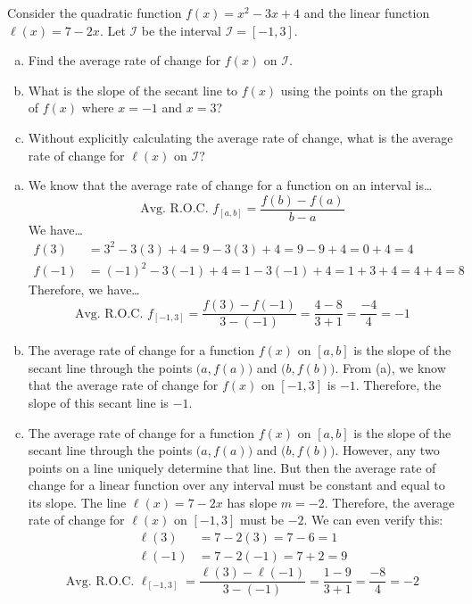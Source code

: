 \documentclass[12pt,letterpaper]{exam}
\begin{document}
\begin{questions}
	

\newpage
\question[10] Consider the quadratic function $f(x)= x^2 - 3x + 4$ and the linear function $\ell(x)= 7 - 2x$. Let $\mathcal{I}$ be the interval $\mathcal{I}= [-1, 3]$.
	\begin{enumerate}[(a)]
	\item Find the average rate of change for $f(x)$ on $\mathcal{I}$.
	\item What is the slope of the secant line to $f(x)$ using the points on the graph of $f(x)$ where $x= -1$ and $x= 3$?
	\item Without explicitly calculating the average rate of change, what is the average rate of change for $\ell(x)$ on $\mathcal{I}$?
	\end{enumerate} \pspace

\sol 
\begin{enumerate}[(a)]
\item We know that the average rate of change for a function on an interval is\dots
	\[
	\text{Avg. R.O.C. } f_{[a,b]}= \dfrac{f(b) - f(a)}{b - a}
	\]
We have\dots
	\[
	\begin{aligned}
	f(3)&= 3^2 - 3(3) + 4= 9 - 3(3) + 4= 9 - 9 + 4= 0 + 4= 4 \\
	f(-1)&= (-1)^2 - 3(-1) + 4= 1 - 3(-1) + 4= 1 + 3 + 4= 4 + 4= 8 
	\end{aligned}
	\]
Therefore, we have\dots
	\[
	\text{Avg. R.O.C. } f_{[-1,3]}= \dfrac{f(3) - f(-1)}{3 - (-1)}= \dfrac{4 - 8}{3 + 1}= \dfrac{-4}{4}= -1
	\] \pspace

\item The average rate of change for a function $f(x)$ on $[a, b]$ is the slope of the secant line through the points $\big(a, f(a) \big)$ and $\big(b, f(b) \big)$. From (a), we know that the average rate of change for $f(x)$ on $[-1, 3]$ is $-1$. Therefore, the slope of this secant line is $-1$. \pspace

\item The average rate of change for a function $f(x)$ on $[a, b]$ is the slope of the secant line through the points $\big(a, f(a) \big)$ and $\big(b, f(b) \big)$. However, any two points on a line uniquely determine that line. But then the average rate of change for a linear function over any interval must be constant and equal to its slope. The line $\ell(x)= 7 - 2x$ has slope $m= -2$. Therefore, the average rate of change for $\ell(x)$ on $[-1, 3]$ must be $-2$. We can even verify this:
	\[
	\begin{aligned}
	\ell(3)&= 7 - 2(3)= 7 - 6= 1 \\
	\ell(-1)&= 7 - 2(-1)= 7 + 2= 9 
	\end{aligned}
	\]
	\[
	\text{Avg. R.O.C. } \ell_{[-1,3]}= \dfrac{\ell(3) - \ell(-1)}{3 - (-1)}= \dfrac{1 - 9}{3 + 1}= \dfrac{-8}{4}= -2
	\]
\end{enumerate}




\end{questions}
\end{document}
